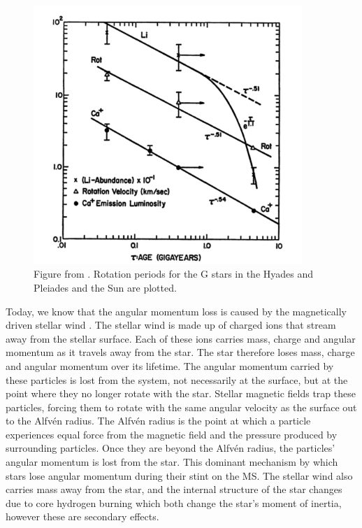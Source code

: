 \begin{figure}
\begin{center}
\includegraphics[width=4in, clip=true]{figures/skumanich.pdf}
\caption{Figure from \citet{skumanich1972}. Rotation periods for the G stars
in the Hyades and Pleiades and the Sun are plotted.}
\label{fig:skumanich}
\end{center}
\end{figure}

Today, we know that the angular momentum loss is caused by the magnetically
driven stellar wind \citep{Schatzman1962, Weber1967, Mestel1984}.
The stellar wind is made up of charged ions that stream away from the stellar
surface.
Each of these ions carries mass, charge and angular momentum as it travels
away from the star.
The star therefore loses mass, charge and angular momentum over its lifetime.
The angular momentum carried by these particles is lost from the system, not
necessarily at the surface, but at the point where they no longer rotate with
the star.
Stellar magnetic fields trap these particles, forcing them to rotate with the
same angular velocity as the surface out to the Alfv{\'e}n radius.
The Alfv{\'e}n radius is the point at which a particle experiences equal force
from the magnetic field and the pressure produced by surrounding particles.
Once they are beyond the Alfv{\'e}n radius, the particles' angular momentum is
lost from the star.
This dominant mechanism by which stars lose angular momentum during their
stint on the MS.
The stellar wind also carries mass away from the star, and the internal
structure of the star changes due to core hydrogen burning which both change
the star's moment of inertia, however these are secondary effects.

